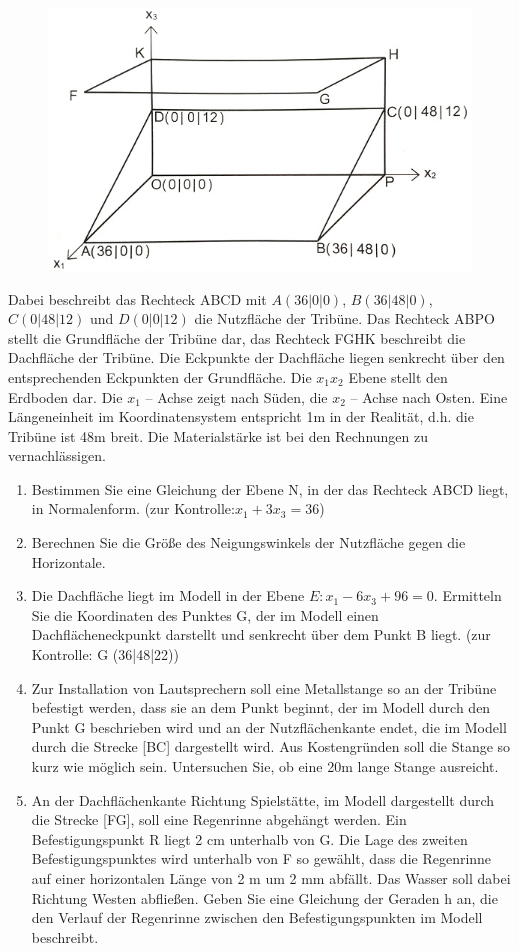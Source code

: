 \documentclass[a4paper,12pt]{article}
\begin{document}
\begin{figure}[h!]
  \begin{center}
    \includegraphics[width=0.7\linewidth]{tribüne.jpg}
  \end{center}
\end{figure}

Dabei beschreibt das Rechteck ABCD mit
  $A (36|0|0)$, $ B (36|48|0)$, $C (0|48|12)$ und $ D (0|0|12) $
die Nutzfläche der Tribüne. Das Rechteck ABPO stellt die Grundfläche der Tribüne dar, das
Rechteck FGHK beschreibt die Dachfläche der Tribüne. Die Eckpunkte der Dachfläche liegen
senkrecht über den entsprechenden Eckpunkten der Grundfläche.
Die $x_1x_2 $  Ebene stellt den Erdboden dar. Die $ x_1$ – Achse zeigt nach Süden, die $x_2$ – Achse nach
Osten. Eine Längeneinheit im Koordinatensystem entspricht 1m in der Realität, d.h. die Tribüne ist
48m breit. Die Materialstärke ist bei den Rechnungen zu vernachlässigen.
\begin{enumerate}[label={\alph*)}]
\item  Bestimmen Sie eine Gleichung der Ebene N, in der das Rechteck ABCD liegt, in
Normalenform. (zur Kontrolle:$ x_1 + 3x_3 = 36 $)
\item Berechnen Sie die Größe des Neigungswinkels der Nutzfläche gegen die Horizontale.
\item Die Dachfläche liegt im Modell in der Ebene $E: x_1 - 6x_3 + 96 = 0.$
Ermitteln Sie die Koordinaten des Punktes G, der im Modell einen Dachflächeneckpunkt
darstellt und senkrecht über dem Punkt B liegt. (zur Kontrolle: G (36|48|22))
\item Zur Installation von Lautsprechern soll eine Metallstange so an der Tribüne befestigt
werden, dass sie an dem Punkt beginnt, der im Modell durch den Punkt G beschrieben wird
und an der Nutzflächenkante endet, die im Modell durch die Strecke [BC] dargestellt wird.
Aus Kostengründen soll die Stange so kurz wie möglich sein. Untersuchen Sie, ob eine 20m
lange Stange ausreicht.
\item An der Dachflächenkante Richtung Spielstätte, im Modell dargestellt durch die Strecke
[FG], soll eine Regenrinne abgehängt werden. Ein Befestigungspunkt R liegt 2 cm
unterhalb von G. Die Lage des zweiten Befestigungspunktes wird unterhalb von F so
gewählt, dass die Regenrinne auf einer horizontalen Länge von 2 m um 2 mm abfällt. Das
Wasser soll dabei Richtung Westen abfließen. Geben Sie eine Gleichung der Geraden h an,
die den Verlauf der Regenrinne zwischen den Befestigungspunkten im Modell beschreibt.
\end{enumerate}
\end{document}
